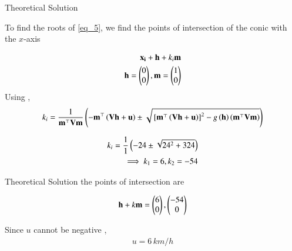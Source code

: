 \documentclass{beamer}
\begin{document}
\begin{frame}{Theoretical Solution}

To find the roots of \ref{eq_5}, we find the points of intersection of the conic with the $x$-axis

\begin{align}
    \mathbf{x_i} + \mathbf{h} + k_i\mathbf{m} \\ 
    \mathbf{h} = \begin{pmatrix}0\\0\end{pmatrix} , \mathbf{m} = \begin{pmatrix}1\\0\end{pmatrix}
\end{align}
Using , 
\begin{align}
    k_i = \frac{1}{\mathbf{m}^{\top}\mathbf{V}\mathbf{m}}\left(-\mathbf{m}^{\top}\left(\mathbf{V}\mathbf{h}+\mathbf{u}\right) \pm \sqrt{{}\left[\mathbf{m}^{\top}\left(\mathbf{V}\mathbf{h}+\mathbf{u}\right)\right]^2-g\left(\mathbf{h}\right)\left(\mathbf{m}^{\top}\mathbf{V}\mathbf{m}\right)}\right)
\end{align}

\begin{align}
    k_i = \frac{1}{1}\left(-24 \pm \sqrt{24^2 + 324}\right) \\ 
    \implies k_1 = 6 , k_2 = -54
\end{align}
\end{frame}
\begin{frame}{Theoretical Solution}
\Hence the points of intersection are 

\begin{align}
    \mathbf{h} + k\mathbf{m} = \begin{pmatrix}6 \\ 0 \end{pmatrix} , \begin{pmatrix}-54\\0\end{pmatrix}
\end{align}

Since $u$ cannot be negative , 
\begin{align}
    u = 6\,km/h
\end{align}
\end{frame}
\end{document}
